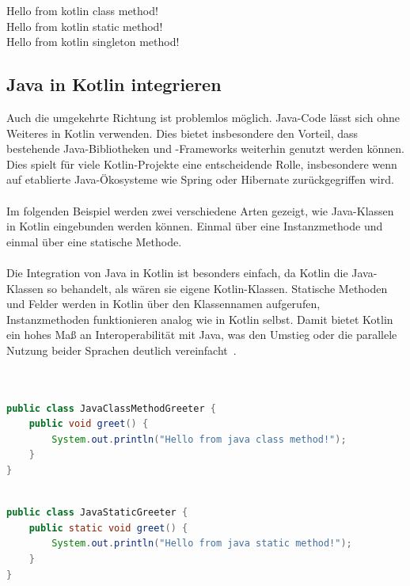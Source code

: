\documentclass[11pt]{article}
\begin{document}
    \begin{tcolorbox}[colback=black!5!white, colframe=black, title=Ausgabe]
        Hello from kotlin class method!\\
        Hello from kotlin static method!\\
        Hello from kotlin singleton method!
    \end{tcolorbox}
    
    \subsection{Java in Kotlin integrieren}
    Auch die umgekehrte Richtung ist problemlos möglich.
    Java-Code lässt sich ohne Weiteres in Kotlin verwenden.
    Dies bietet insbesondere den Vorteil, dass bestehende Java-Bibliotheken und -Frameworks weiterhin genutzt werden können.
    Dies spielt für viele Kotlin-Projekte eine entscheidende Rolle, insbesondere wenn auf etablierte Java-Ökosysteme wie Spring oder Hibernate zurückgegriffen wird.\\
    \\
    Im folgenden Beispiel werden zwei verschiedene Arten gezeigt, wie Java-Klassen in Kotlin eingebunden werden können.
    Einmal über eine Instanzmethode und einmal über eine statische Methode.\\
    \\
    Die Integration von Java in Kotlin ist besonders einfach, da Kotlin die Java-Klassen so behandelt, als wären sie eigene Kotlin-Klassen.
    Statische Methoden und Felder werden in Kotlin über den Klassennamen aufgerufen, Instanzmethoden funktionieren analog wie in Kotlin selbst.
    Damit bietet Kotlin ein hohes Maß an Interoperabilität mit Java, was den Umstieg oder die parallele Nutzung beider Sprachen deutlich vereinfacht~\cite{kotlin-java-in-kotlin}.\\
    \\

    \begin{lstlisting}[language=Java, caption={JavaClassMethodGreeter.java}]

public class JavaClassMethodGreeter {
    public void greet() {
        System.out.println("Hello from java class method!");
    }
}
    \end{lstlisting}

    \begin{lstlisting}[language=Java, caption={JavaStaticGreeter.java}]

public class JavaStaticGreeter {
    public static void greet() {
        System.out.println("Hello from java static method!");
    }
}

    \end{lstlisting}
\end{document}
